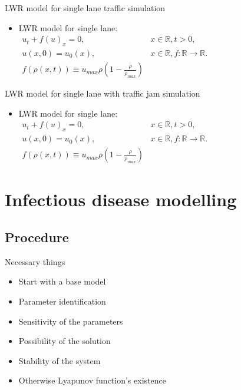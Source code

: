 \documentclass{beamer}
\begin{document}
\begin{frame}{LWR model for single lane traffic simulation}
\begin{itemize}
\item {LWR model for single lane: $\begin{array}{cc}
u_{t}+f\left(u\right)_{x}=0, & x\in\mathbb{R},t>0,\\
u\left(x,0\right)=u_{0}\left(x\right), & x\mathbb{\in R},f:\mathbb{\mathbb{R}\rightarrow R}.\\
f\left(\rho\left(x,t\right)\right)\equiv u_{max}\rho\left(1-\frac{\rho}{\rho_{max}}\right)
\end{array}$}
\end{itemize}
\end{frame}

\begin{frame}{LWR model for single lane with traffic jam simulation}
\begin{itemize}
\item {LWR model for single lane: $\begin{array}{cc}
u_{t}+f\left(u\right)_{x}=0, & x\in\mathbb{R},t>0,\\
u\left(x,0\right)=u_{0}\left(x\right), & x\mathbb{\in R},f:\mathbb{\mathbb{R}\rightarrow R}.\\
f\left(\rho\left(x,t\right)\right)\equiv u_{max}\rho\left(1-\frac{\rho}{\rho_{max}}\right)
\end{array}$}
\end{itemize}
\end{frame}

\section{Infectious disease modelling}

\subsection{Procedure}

\begin{frame}{Necessary things}
\begin{itemize}
\item {Start with a base model}
\item {Parameter identification}
\item {Sensitivity of the parameters}
\item {Possibility of the solution}
\item {Stability of the system}
\item {Otherwise Lyapunov function's existence}
\end{itemize}
\end{frame}
\end{document}
